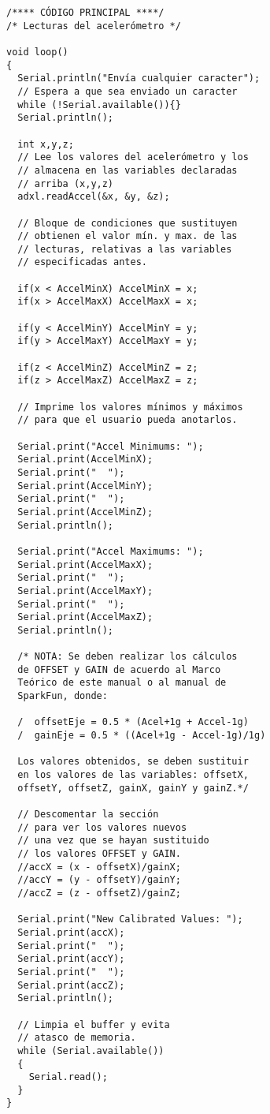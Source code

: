 \documentclass[10pt, a4paper, twocolumn]{article} %
\begin{document}
\begin{verbatim}
/**** CÓDIGO PRINCIPAL ****/
/* Lecturas del acelerómetro */

void loop()
{
  Serial.println("Envía cualquier caracter");
  // Espera a que sea enviado un caracter  
  while (!Serial.available()){}
  Serial.println();
  
  int x,y,z;
  // Lee los valores del acelerómetro y los
  // almacena en las variables declaradas
  // arriba (x,y,z)
  adxl.readAccel(&x, &y, &z);
    
  // Bloque de condiciones que sustituyen
  // obtienen el valor mín. y max. de las
  // lecturas, relativas a las variables
  // especificadas antes.
  
  if(x < AccelMinX) AccelMinX = x;
  if(x > AccelMaxX) AccelMaxX = x;

  if(y < AccelMinY) AccelMinY = y;
  if(y > AccelMaxY) AccelMaxY = y;

  if(z < AccelMinZ) AccelMinZ = z;
  if(z > AccelMaxZ) AccelMaxZ = z;
  
  // Imprime los valores mínimos y máximos
  // para que el usuario pueda anotarlos.
  
  Serial.print("Accel Minimums: "); 
  Serial.print(AccelMinX); 
  Serial.print("  ");
  Serial.print(AccelMinY); 
  Serial.print("  "); 
  Serial.print(AccelMinZ);
  Serial.println();
  
  Serial.print("Accel Maximums: ");
  Serial.print(AccelMaxX);
  Serial.print("  ");
  Serial.print(AccelMaxY);
  Serial.print("  ");
  Serial.print(AccelMaxZ);
  Serial.println();
  
  /* NOTA: Se deben realizar los cálculos
  de OFFSET y GAIN de acuerdo al Marco
  Teórico de este manual o al manual de 
  SparkFun, donde: 
  
  /  offsetEje = 0.5 * (Acel+1g + Accel-1g)
  /  gainEje = 0.5 * ((Acel+1g - Accel-1g)/1g)
  
  Los valores obtenidos, se deben sustituir
  en los valores de las variables: offsetX,
  offsetY, offsetZ, gainX, gainY y gainZ.*/

  // Descomentar la sección
  // para ver los valores nuevos
  // una vez que se hayan sustituido
  // los valores OFFSET y GAIN.  
  //accX = (x - offsetX)/gainX;
  //accY = (y - offsetY)/gainY;
  //accZ = (z - offsetZ)/gainZ;

  Serial.print("New Calibrated Values: ");
  Serial.print(accX);
  Serial.print("  ");
  Serial.print(accY);
  Serial.print("  ");
  Serial.print(accZ);
  Serial.println(); 
  
  // Limpia el buffer y evita
  // atasco de memoria.
  while (Serial.available())
  {
    Serial.read();
  }
}
\end{verbatim}
\end{document}
